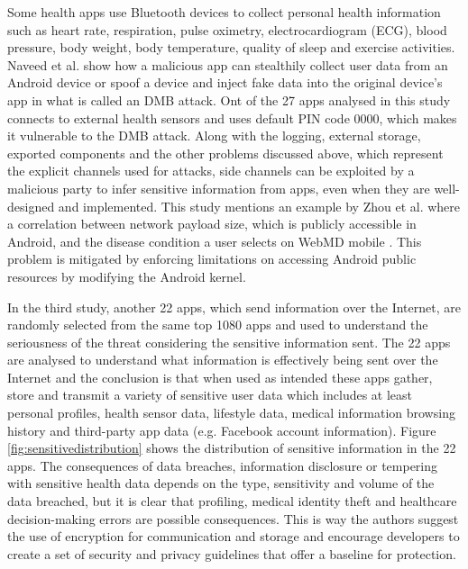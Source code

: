 Some health apps use Bluetooth devices to collect personal health information such as heart rate, respiration, pulse oximetry, electrocardiogram (ECG), blood pressure, body weight, body temperature, quality of sleep and exercise activities. Naveed et al. \cite{naveed2014inside} show how a malicious app can stealthily collect user data from an Android device or spoof a device and inject fake data into the original device's app in what is called an \ac{DMB} attack. Ont of the 27 apps analysed in this study connects to external health sensors and uses default PIN code 0000, which makes it vulnerable to the \ac{DMB} attack. Along with the logging, external storage, exported components and the other problems discussed above, which represent the explicit channels used for attacks, side channels can be exploited by a malicious party to infer sensitive information from apps, even when they are well-designed and implemented. This study mentions an example by Zhou et al. \cite{zhou2013identity} where a correlation between network payload size, which is publicly accessible in Android, and the disease condition a user selects on WebMD mobile \cite{webmd}. This problem is mitigated by enforcing limitations on accessing Android public resources by modifying the Android kernel. 

In the third study, another 22 apps, which send information over the Internet, are randomly selected from the same top 1080 apps and used to understand the seriousness of the threat considering the sensitive information sent. The 22 apps are analysed to understand what information is effectively being sent over the Internet and the conclusion is that when used as intended these apps gather, store and transmit a variety of sensitive user data which includes at least personal profiles, health sensor data, lifestyle data, medical information browsing history and third-party app data (e.g. Facebook account information). Figure \ref{fig:sensitivedistribution} shows the distribution of sensitive information in the 22 apps. The consequences of data breaches, information disclosure or tempering with sensitive health data depends on the type, sensitivity and volume of the data breached, but it is clear that profiling, medical identity theft and healthcare decision-making errors are possible consequences. This is way the authors suggest the use of encryption for communication and storage and encourage developers to create a set of security and privacy guidelines that offer a baseline for protection.

